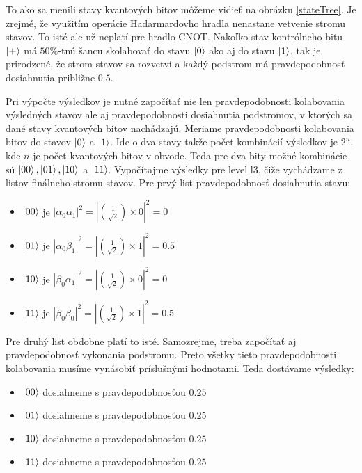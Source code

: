 To ako sa menili stavy kvantových bitov môžeme vidieť na obrázku
\ref{stateTree}. Je zrejmé, že využitím operácie Hadarmardovho hradla nenastane
vetvenie stromu stavov. To isté ale už neplatí pre hradlo CNOT. Nakoľko stav
kontrólneho bitu \(\ket{+}\) má \(50\%\)-tnú šancu skolabovať do stavu 
\(\ket{0}\) ako aj do stavu \(\ket{1}\), tak je prirodzené, že strom stavov 
sa rozvetví a každý podstrom má pravdepodobnosť dosiahnutia približne \(0.5\).

Pri výpočte výsledkov je nutné započítať nie len pravdepodobnosti kolabovania
výsledných stavov ale aj pravdepodobnosti dosiahnutia podstromov, v ktorých 
sa dané stavy kvantových bitov nachádzajú. Meriame pravdepodobnosti kolabovania
bitov do stavov \(\ket{0}\) a \(\ket{1}\). Ide o dva stavy takže počet
kombinácií výsledkov je \(2^n\), kde \(n\) je počet kvantových bitov v obvode.
Teda pre dva bity možné kombinácie sú \(\ket{00}, \ket{01}, \ket{10}\) a
\(\ket{11}\). Vypočítajme výsledky pre level l3, čiže vychádzame z listov 
finálneho stromu stavov. Pre prvý list pravdepodobnosť dosiahnutia stavu:

\begin{itemize}
    \item \(\ket{00}\) je \(|\alpha_0\alpha_1|^2 = |\binom{1}{\sqrt{2}} \times
0|^2 = 0\)
    \item \(\ket{01}\) je \(|\alpha_0\beta_1|^2 = |\binom{1}{\sqrt{2}} \times
1|^2 = 0.5\)
    \item \(\ket{10}\) je \(|\beta_0\alpha_1|^2 = |\binom{1}{\sqrt{2}} \times
0|^2 = 0\)
    \item \(\ket{11}\) je \(|\beta_0\beta_0|^2 = |\binom{1}{\sqrt{2}} \times
1|^2 = 0.5\)
\end{itemize}

Pre druhý list obdobne platí to isté. Samozrejme, treba započítať aj
pravdepodobnosť vykonania podstromu. Preto všetky tieto pravdepodobnosti
kolabovania musíme vynásobiť príslušnými hodnotami. Teda dostávame výsledky:
\begin{itemize}
    \item \(\ket{00}\) dosiahneme s pravdepodobnosťou \(0.25\)
    \item \(\ket{01}\) dosiahneme s pravdepodobnosťou \(0.25\)
    \item \(\ket{10}\) dosiahneme s pravdepodobnosťou \(0.25\)
    \item \(\ket{11}\) dosiahneme s pravdepodobnosťou \(0.25\)
\end{itemize}

